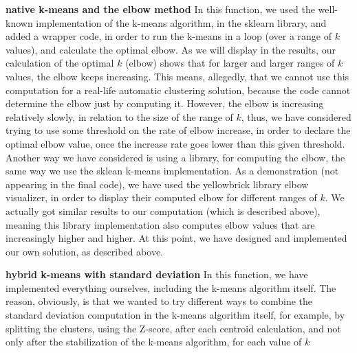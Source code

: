 \documentclass[12pt]{article}
\begin{document}
\textbf{native k-means and the elbow method} \newline
In this function, we used the well-known implementation of the k-means algorithm, in the sklearn library, and added a wrapper code, in order to run the k-means in a loop (over a range of $k$ values), and calculate the optimal elbow. \newline
As we will display in the results, our calculation of the optimal $k$ (elbow) shows that for larger and larger ranges of $k$ values, the elbow keeps increasing. This means, allegedly, that we cannot use this computation for a real-life automatic clustering solution, because the code cannot determine the elbow just by computing it. \newline
However, the elbow is increasing relatively slowly, in relation to the size of the range of $k$, thus, we have considered trying to use some threshold on the rate of elbow increase, in order to declare the optimal elbow value, once the increase rate goes lower than  this given threshold. \newline
Another way we have considered is using a library, for computing the elbow, the same way we use the sklean k-means implementation. \newline
As a demonstration (not appearing in the final code), we have used the yellowbrick library elbow visualizer, in order to display their computed elbow for different ranges of $k$. We actually got similar results to our computation (which is described above), meaning this library implementation also computes elbow values that are increasingly higher and higher. \newline
At this point, we have designed and implemented our own solution, as described above. \newline

\textbf{hybrid k-means with standard deviation} \newline
In this function, we have implemented everything ourselves, including the k-means algorithm itself. \newline
The reason, obviously, is that we wanted to try different ways to combine the standard deviation computation in the k-means algorithm itself, for example, by splitting the clusters, using the Z-score, after each centroid calculation, and not only after the stabilization of the k-means algorithm,
for each value of $k$\newline 
\end{document}
